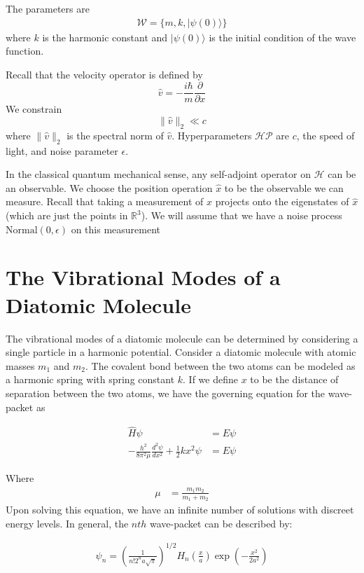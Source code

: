 \documentclass[book.tex]{subfiles}
\begin{document}
The parameters are 
\begin{align}
\mathcal{W} = \{m, k, |\psi(0)\rangle \}
\end{align}
where $k$ is the harmonic constant and $|\psi(0)\rangle$ is the initial condition of the wave function.

Recall that the velocity operator is defined by
\[ \hat{v} = -\frac{i\hbar}{m} \frac{\partial}{\partial x} \]
We constrain
\[ \|\hat{v}\|_2 \ll c \]
where $\| \hat{v}\|_2$ is the spectral norm of $\hat{v}$.
Hyperparameters $\mathcal{HP}$ are $c$, the speed of light, and noise parameter $\epsilon$.

In the classical quantum mechanical sense, any self-adjoint operator on $\mathcal{H}$ can be an observable. We choose the position operation $\hat{x}$ to be the observable we can measure. Recall that taking a measurement of $\hat{x}$ projects onto the eigenstates of $\hat{x}$ (which are just the points in $\mathbb{R}^3$). We will assume that we have a noise process $\mathrm{Normal}(0, \epsilon)$ on this measurement

\label{phs:theory:moving:particle}

\section{The Vibrational Modes of a Diatomic Molecule}

The vibrational modes of a diatomic molecule can be determined by considering a single particle in a harmonic potential. Consider a diatomic molecule with atomic masses $m_1$
and $m_2$. The covalent bond between the two atoms can be modeled as a harmonic spring with spring constant $k$. If we define $x$ to be the distance of separation between the two atoms, we have the governing equation for the wave-packet as %

\begin{align}
\hat{H} \psi &= E \psi \\
-\frac{h^2}{8 \pi^2 \mu} \frac{d^2\psi}{dx^2} + \frac{1}{2}kx^2\psi &= E \psi
\end{align}

Where 
\begin{align}
\mu &= \frac{m_1m_2}{m_1+m_2}
\end{align}
Upon solving this equation, we have an infinite number of solutions with discreet energy levels. In general, the $nth$ wave-packet can be described by:

\begin{align}\label{exmp4b}
\psi_n = \left(\frac{1}{n!2^na\sqrt{\pi}}\right)^{1/2} H_n\left(\frac{x}{a}\right) \exp\left(-\frac{x^2}{2a^2}\right)
\end{align}
\end{document}
